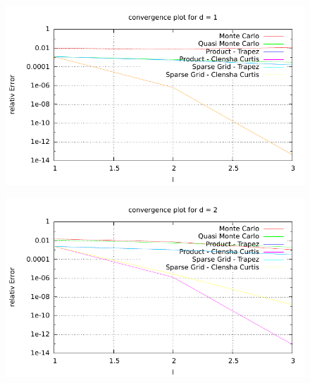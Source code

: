 \documentclass{article}
\begin{document}
\begin{figure}[htbp]
  \centering
     \includegraphics[width=1.0\textwidth]{../Task13/sh3_task13_convergencePlotd1.pdf}
\end{figure}
\newpage
\begin{figure}[htbp]
  \centering
     \includegraphics[width=1.0\textwidth]{../Task13/sh3_task13_convergencePlotd2.pdf}
\end{figure}
\end{document}
